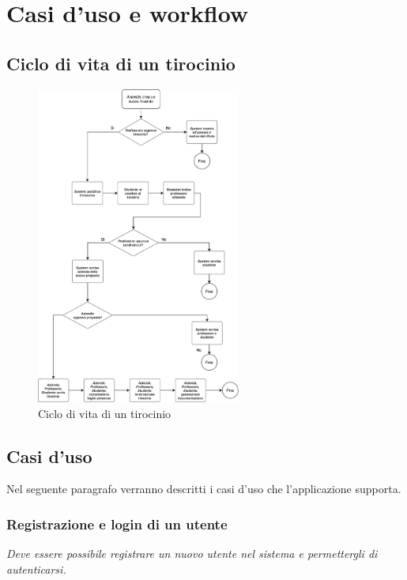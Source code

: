 \chapter{Casi d'uso e workflow}

\section{Ciclo di vita di un tirocinio}
\begin{figure}[H]
	\centering
	\includegraphics[width=0.6\textwidth]{Chapter3/Figs/states-flaw}
	\caption[Ciclo di vita di un tirocinio]{Ciclo di vita di un tirocinio}
	\label{fig:workflaw}
\end{figure}

\section{Casi d'uso}

Nel seguente paragrafo verranno descritti i casi d'uso che l'applicazione supporta.

\subsection{Registrazione e login di un utente}

\textit{Deve essere possibile registrare un nuovo utente nel sistema e permettergli di autenticarsi.} \\

